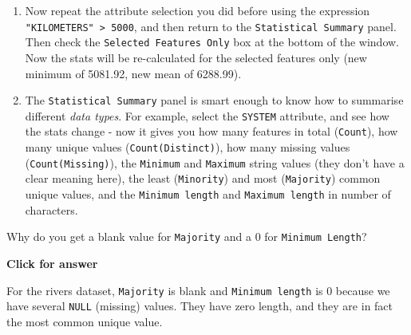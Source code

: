 \documentclass[
  letterpaper,
  DIV=11,
  numbers=noendperiod]{scrreprt}
\begin{document}
\begin{enumerate}
\def\labelenumi{(\arabic{enumi})}
\setcounter{enumi}{97}
\item
  Now repeat the attribute selection you did before using the expression
  \texttt{"KILOMETERS"\ \textgreater{}\ 5000}, and then return to the
  \texttt{Statistical\ Summary} panel. Then check the
  \texttt{Selected\ Features\ Only} box at the bottom of the window. Now
  the stats will be re-calculated for the selected features only (new
  minimum of 5081.92, new mean of 6288.99).
\item
  The \texttt{Statistical\ Summary} panel is smart enough to know how to
  summarise different \emph{data types}. For example, select the
  \texttt{SYSTEM} attribute, and see how the stats change - now it gives
  you how many features in total (\texttt{Count}), how many unique
  values (\texttt{Count(Distinct)}), how many missing values
  (\texttt{Count(Missing)}), the \texttt{Minimum} and \texttt{Maximum}
  string values (they don't have a clear meaning here), the least
  (\texttt{Minority}) and most (\texttt{Majority}) common unique values,
  and the \texttt{Minimum\ length} and \texttt{Maximum\ length} in
  number of characters.
\end{enumerate}

\begin{tcolorbox}[enhanced jigsaw, breakable, toptitle=1mm, colback=white, left=2mm, leftrule=.75mm, titlerule=0mm, colframe=quarto-callout-important-color-frame, opacityback=0, title=\textcolor{quarto-callout-important-color}{\faExclamation}\hspace{0.5em}{Stop and Think}, toprule=.15mm, opacitybacktitle=0.6, bottomtitle=1mm, colbacktitle=quarto-callout-important-color!10!white, bottomrule=.15mm, coltitle=black, rightrule=.15mm, arc=.35mm]

Why do you get a blank value for \texttt{Majority} and a 0 for
\texttt{Minimum\ Length}?

\end{tcolorbox}

\begin{tcolorbox}[enhanced jigsaw, leftrule=.75mm, colframe=quarto-callout-important-color-frame, breakable, toprule=.15mm, bottomrule=.15mm, arc=.35mm, rightrule=.15mm, opacityback=0, colback=white, left=2mm]

\vspace{-3mm}\textbf{Click for answer}\vspace{3mm}

For the rivers dataset, \texttt{Majority} is blank and
\texttt{Minimum\ length} is 0 because we have several \texttt{NULL}
(missing) values. They have zero length, and they are in fact the most
common unique value.

\end{tcolorbox}
\end{document}
